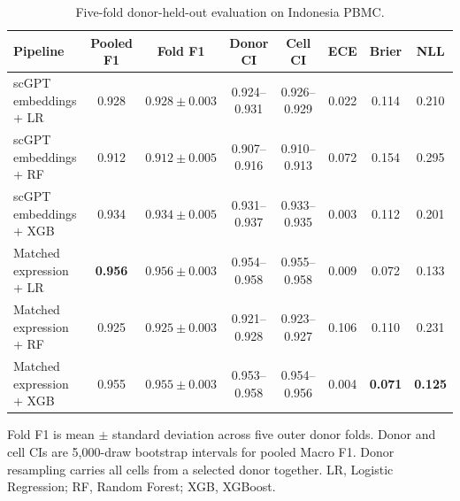 \begin{table}[p]
\centering
\caption{Five-fold donor-held-out evaluation on Indonesia PBMC.}
\label{tab:donor}
\scriptsize
\setlength{\tabcolsep}{2.7pt}
\begin{threeparttable}
\begin{tabular}{lccccccc}
\toprule
Pipeline & Pooled F1 & Fold F1 & Donor CI & Cell CI & ECE & Brier & NLL \\
\midrule
scGPT embeddings + LR & 0.928 & $0.928\pm0.003$ & 0.924--0.931 & 0.926--0.929 & 0.022 & 0.114 & 0.210 \\
scGPT embeddings + RF & 0.912 & $0.912\pm0.005$ & 0.907--0.916 & 0.910--0.913 & 0.072 & 0.154 & 0.295 \\
scGPT embeddings + XGB & 0.934 & $0.934\pm0.005$ & 0.931--0.937 & 0.933--0.935 & 0.003 & 0.112 & 0.201 \\
Matched expression + LR & \textbf{0.956} & $\mathbf{0.956\pm0.003}$ & 0.954--0.958 & 0.955--0.958 & 0.009 & 0.072 & 0.133 \\
Matched expression + RF & 0.925 & $0.925\pm0.003$ & 0.921--0.928 & 0.923--0.927 & 0.106 & 0.110 & 0.231 \\
Matched expression + XGB & 0.955 & $0.955\pm0.003$ & 0.953--0.958 & 0.954--0.956 & 0.004 & \textbf{0.071} & \textbf{0.125} \\
\bottomrule
\end{tabular}
\begin{tablenotes}[flushleft]\scriptsize
\item Fold F1 is mean $\pm$ standard deviation across five outer donor folds. Donor and cell CIs are 5,000-draw bootstrap intervals for pooled Macro F1. Donor resampling carries all cells from a selected donor together. LR, Logistic Regression; RF, Random Forest; XGB, XGBoost.
\end{tablenotes}
\end{threeparttable}
\end{table}
